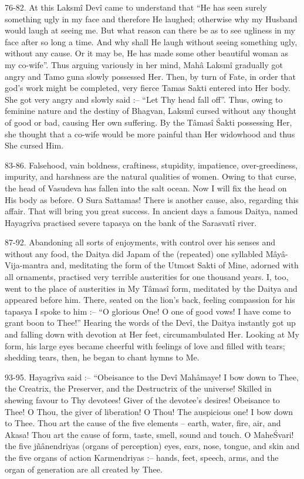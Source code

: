 76-82. At this Laksm\^i Dev\^i came to understand that ``He has seen surely something ugly in my face and therefore He laughed; otherwise why my Husband would laugh at seeing me. But what reason can there be as to see ugliness in my face after so long a time. And why shall He laugh without seeing something ugly, without any cause. Or it may be, He has made some other beautiful woman as my co-wife''. Thus arguing variously in her mind, Mah\^a Laksm\^i gradually got angry and Tamo guna slowly possessed Her. Then, by turn of Fate, in order that god’s work might be completed, very fierce Tamas Sakti entered into Her body. She got very angry and slowly said :-- ``Let Thy head fall off''. Thus, owing to feminine nature and the destiny of Bhagvan, Laksm\^i cursed without any thought of good or bad, causing Her own suffering. By the T\^amas\^i \'Sakti possessing Her, she thought that a co-wife would be more painful than Her widowhood and thus She cursed Him.

83-86. Falsehood, vain boldness, craftiness, stupidity, impatience, over-greediness, impurity, and harshness are the natural qualities of women. Owing to that curse, the head of Vasudeva has fallen into the salt ocean. Now I will fix the head on His body as before. O Sura Sattamas! There is another cause, also, regarding this affair. That will bring you great success. In ancient days a famous Daitya, named Hayagr\^iva practised severe tapasya on the bank of the Sarasvat\^i river.

87-92. Abandoning all sorts of enjoyments, with control over his senses and without any food, the Daitya did Japam of the (repeated) one syllabled M\^ay\^a-Vija-mantra and, meditating the form of the Utmost Sakti of Mine, adorned with all ornaments, practised very terrible austerities for one thousand years. I, too, went to the place of austerities in My T\^amas\^i form, meditated by the Daitya and appeared before him. There, seated on the lion's back, feeling compassion for his tapasya I spoke to him :-- ``O glorious One! O one of good vows! I have come to grant boon to Thee!'' Hearing the words of the Dev\^i, the Daitya instantly got up and falling down with devotion at Her feet, circumambulated Her. Looking at My form, his large eyes became cheerful with feelings of love and filled with tears; shedding tears, then, he began to chant hymns to Me.

93-95. Hayagr\^iva said :-- ``Obeisance to the Dev\^i Mah\^amaye! I bow down to Thee, the Creatrix, the Preserver, and the Destructrix of the universe! Skilled in shewing favour to Thy devotees! Giver of the devotee's desires! Obeisance to Thee! O Thou, the giver of liberation! O Thou! The auspicious one! I bow down to Thee. Thou art the cause of the five elements -- earth, water, fire, air, and Akasa! Thou art the cause of form, taste, smell, sound and touch. O Mahe\'Svari! the five jñ\^anendriyas (organs of perception) eyes, ears, nose, tongue, and skin and the five organs of action Karmendriyas :-- hands, feet, speech, arms, and the organ of generation are all created by Thee.

